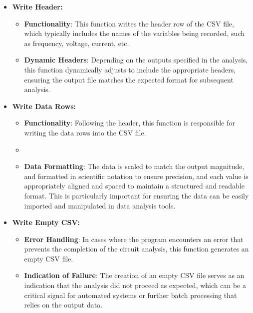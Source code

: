 \documentclass[conference]{IEEEtran}
\begin{document}
\begin{itemize}
  \item \textbf{Write Header:}
        \begin{itemize}
          \item \textbf{Functionality}: This function writes the header row of the CSV file, which typically includes the names of the
                variables being recorded, such as frequency, voltage, current, etc.
          \item \textbf{Dynamic Headers}: Depending on the outputs specified in the analysis, this function dynamically adjusts to include
                the appropriate headers, ensuring the output file matches the expected format for subsequent analysis.
        \end{itemize}

  \item \textbf{Write Data Rows:}
        \begin{itemize}
          \item \textbf{Functionality}: Following the header, this function is responsible for writing the data rows into the CSV file.
          \item
          \item \textbf{Data Formatting}: The data is scaled to match the output magnitude, and formatted in scientific notation to ensure precision, and each value is appropriately
                aligned and spaced to maintain a structured and readable format. This is particularly important for ensuring the data can be
                easily imported and manipulated in data analysis tools.
        \end{itemize}

  \item \textbf{Write Empty CSV:}
        \begin{itemize}
          \item \textbf{Error Handling}: In cases where the program encounters an error that prevents the completion of the circuit
                analysis, this function generates an empty CSV file.
          \item \textbf{Indication of Failure}: The creation of an empty CSV file serves as an indication that the analysis did not
                proceed as expected, which can be a critical signal for automated systems or further batch processing that relies on the
                output data.
        \end{itemize}


\end{itemize}
\end{document}
